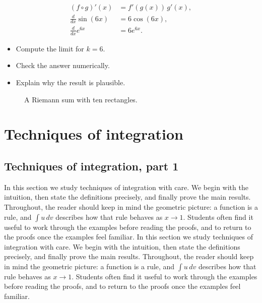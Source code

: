 \documentclass[11pt]{article}
\begin{document}
\begin{align*}
  (f \circ g)'(x) &= f'(g(x))\, g'(x), \\
  \frac{d}{dx} \sin(6 x) &= 6 \cos(6 x), \\
  \frac{d}{dx} e^{6 x} &= 6 e^{6 x}.
\end{align*}

\begin{itemize}
  \item Compute the limit for $k = 6$.
  \item Check the answer numerically.
  \item Explain why the result is plausible.
\end{itemize}

\begin{figure}[ht]
  \centering
  \caption{A Riemann sum with ten rectangles.}
\end{figure}

\section{Techniques of integration}

\subsection{Techniques of integration, part 1}

In this section we study techniques of integration with care. We begin with the intuition, then state the definitions precisely, and finally prove the main results. Throughout, the reader should keep in mind the geometric picture: a function is a rule, and $\int u\,dv$ describes how that rule behaves as $x \to 1$. Students often find it useful to work through the examples before reading the proofs, and to return to the proofs once the examples feel familiar. In this section we study techniques of integration with care. We begin with the intuition, then state the definitions precisely, and finally prove the main results. Throughout, the reader should keep in mind the geometric picture: a function is a rule, and $\int u\,dv$ describes how that rule behaves as $x \to 1$. Students often find it useful to work through the examples before reading the proofs, and to return to the proofs once the examples feel familiar. 
\end{document}
